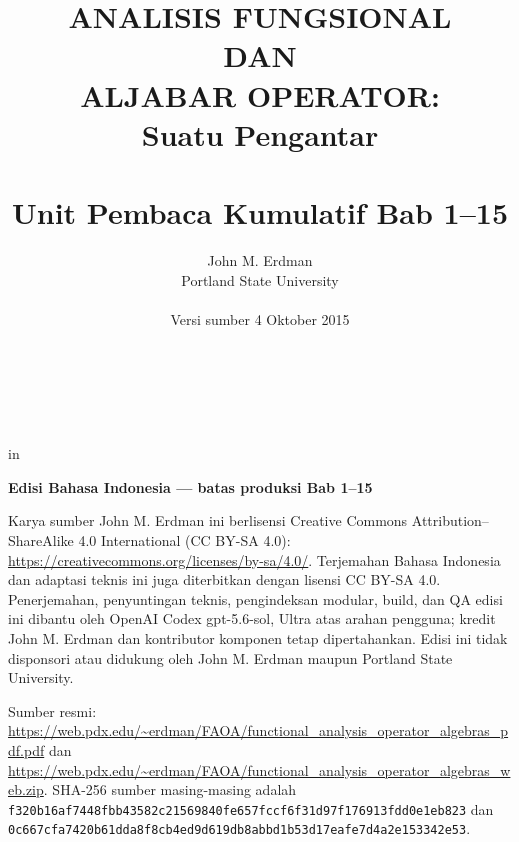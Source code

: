 \documentclass[11pt,reqno]{amsbook}
\theoremstyle{definition}
\theoremstyle{remark}
\numberwithin{equation}{section}
\begin{document}
 \frontmatter
 \title{ANALISIS FUNGSIONAL \\ DAN \\ ALJABAR OPERATOR: \\ Suatu Pengantar \\ \mbox{} \\ \large Unit Pembaca Kumulatif Bab 1--15}
 \author{John M. Erdman \\
      Portland State University \\
      \mbox{\hphantom{P}} \\
      Versi sumber 4 Oktober 2015 \\
      \mbox{\hphantom{P}} \\
      \mbox{\hphantom{P}} \\
            \mbox{\hphantom{P}} \\
                  \mbox{\hphantom{P}} }


 in


\maketitle


\begin{center}
\textbf{Edisi Bahasa Indonesia --- batas produksi Bab 1--15}
\end{center}

Karya sumber John M. Erdman ini berlisensi Creative Commons
Attribution--ShareAlike 4.0 International (CC BY-SA 4.0):
\url{https://creativecommons.org/licenses/by-sa/4.0/}.
Terjemahan Bahasa Indonesia dan adaptasi teknis ini juga diterbitkan dengan
lisensi CC BY-SA 4.0. Penerjemahan, penyuntingan teknis, pengindeksan modular,
build, dan QA edisi ini dibantu oleh OpenAI Codex gpt-5.6-sol, Ultra atas arahan
pengguna; kredit John M. Erdman dan kontributor komponen tetap dipertahankan.
Edisi ini tidak
disponsori atau didukung oleh John M. Erdman maupun Portland State University.

\begin{sloppypar}
Sumber resmi:
\url{https://web.pdx.edu/~erdman/FAOA/functional_analysis_operator_algebras_pdf.pdf}
dan
\url{https://web.pdx.edu/~erdman/FAOA/functional_analysis_operator_algebras_web.zip}.
SHA-256 sumber masing-masing adalah
\texttt{f320b16af7448fbb43582c21569840fe\allowbreak657fccf6f31d97f176913fdd0e1eb823}
dan
\texttt{0c667cfa7420b61dda8f8cb4ed9d619d\allowbreak b8abbd1b53d17eafe7d4a2e153342e53}.
\end{sloppypar}
\end{document}
